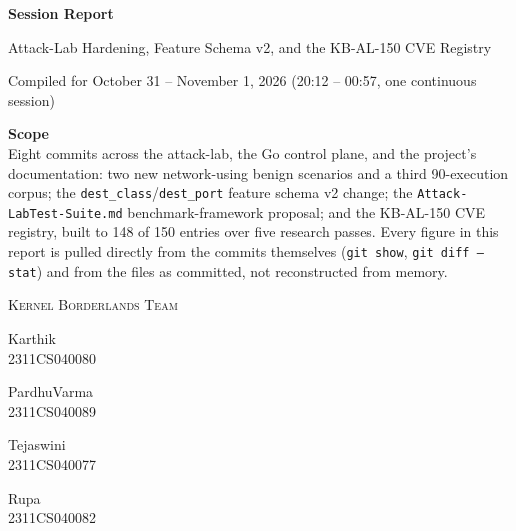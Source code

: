 \documentclass[11pt,a4paper]{article}
\newcommand{\devcredit}[2]{%
  \begin{minipage}[t]{3.2cm}
    \centering
    {\small #1}\\[0.35em]
    {\color{gray!65}\fontfamily{pzc}\selectfont\large #2}
  \end{minipage}%
}
\begin{document}
\begin{titlepage}
\thispagestyle{empty}
\centering
\vspace*{\fill}

{\small{}}

\vspace{1.6cm}

{\fontsize{36}{44}\selectfont\bfseries Session Report}

\vspace{0.8em}

{\normalsize Attack-Lab Hardening, Feature Schema v2, and the KB-AL-150 CVE Registry}

\vspace{1.2cm}

{\small Compiled for October 31 -- November 1, 2026 (20:12 -- 00:57, one continuous session)}

\vspace{1.2cm}

\begin{minipage}{0.82\linewidth}
\centering
\small
\textbf{Scope} \\[0.3em]
Eight commits across the attack-lab, the Go control plane, and the project's
documentation: two new network-using benign scenarios and a third
90-execution corpus; the \texttt{dest\_class}/\texttt{dest\_port} feature
schema v2 change; the \texttt{Attack-LabTest-Suite.md} benchmark-framework
proposal; and the KB-AL-150 CVE registry, built to 148 of 150 entries over
five research passes. Every figure in this report is pulled directly from
the commits themselves (\texttt{git show}, \texttt{git diff --stat}) and
from the files as committed, not reconstructed from memory.
\end{minipage}

\vspace{1.4cm}

{\small \scshape Kernel Borderlands Team}\\[0.9em]
\devcredit{Karthik}{2311CS040080}\hspace{0.6cm}\devcredit{PardhuVarma}{2311CS040089}\hspace{0.6cm}\devcredit{Tejaswini}{2311CS040077}\hspace{0.6cm}\devcredit{Rupa}{2311CS040082}

\vspace{1.5cm}
\end{titlepage}

\tableofcontents
\thispagestyle{plain}
\clearpage
\end{document}
